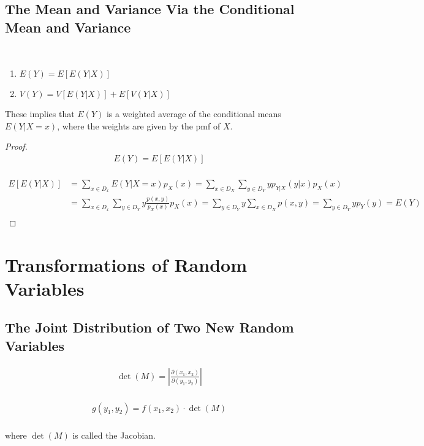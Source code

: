 \subsection{The Mean and Variance Via the Conditional Mean and Variance}

\begin{theorem}
    ~\\
    \begin{enumerate}[label=\textbf{\alph*.}]
        \item $E(Y) = E[E(Y|X)]$
        \item $V(Y) = V[E(Y|X)] + E[V(Y|X)]$
    \end{enumerate}

    These implies that $E(Y)$ is a weighted average of the conditional means $E(Y|X=x)$, where the weights are given by the pmf of $X$. 
\end{theorem}

\begin{proof}
    \begin{align*}
        E(Y) = E[E(Y|X)] \\
    \end{align*}

    \begin{align*}
        E[E(Y|X)] & = \sum_{x\in D_x} E(Y|X=x)p_X(x) = \sum_{x\in D_X}\sum_{y\in D_Y} y p_{Y|X}(y|x)p_X(x) \\
        & = \sum_{x\in D_x}\sum_{y\in D_Y} y \frac{p(x,y)}{p_X(x)} p_X(x) = \sum_{y\in D_Y} y \sum_{x\in D_X} p(x,y) = \sum_{y\in D_Y} yp_Y(y) = E(Y) \\
    \end{align*}
\end{proof}

\section{Transformations of Random Variables}

\subsection{The Joint Distribution of Two New Random Variables}

\begin{theorem}
    \begin{align*}
        \det(M) = \left|\frac{\partial(x_1,x_2)}{\partial(y_1,y_2)}\right| \\
    \end{align*}

    \begin{align*}
        g(y_1,y_2) = f(x_1,x_2)\cdot\det(M) \\
    \end{align*}

    where $\det(M)$ is called the Jacobian.
\end{theorem}

